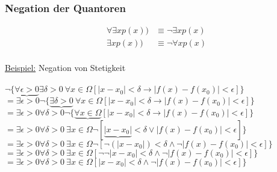 \subsubsection{Negation der Quantoren}
\begin{align*}
\forall\exists x  p(x)) & \equiv \neg\exists x p(x)\\
 \exists x  p(x)) & \equiv  \neg\forall x p(x)
\end{align*}\\
\underline{Beispiel:} Negation von Stetigkeit\\\qquad\\
$\neg\{\underbrace{\forall\epsilon>0}\exists\delta>0~\forall x\in \Omega [|x-x_{0}|<\delta\rightarrow|f(x)-f(x_{0})|<\epsilon]\}$\\
$=\exists\epsilon>0\neg\{\underbrace{\exists\delta>0}~\forall x\in \Omega [|x-x_{0}|<\delta\rightarrow|f(x)-f(x_{0})|<\epsilon]\}$\\
$=\exists\epsilon>0\forall\delta>0\neg\{\underbrace{\forall x\in \Omega} [|x-x_{0}|<\delta\rightarrow|f(x)-f(x_{0})|<\epsilon]\}$\\
$=\exists\epsilon>0\forall\delta>0~\exists x\in \Omega\neg [\underbrace{|x-x_{0}|}<\delta\vee|f(x)-f(x_{0})|<\epsilon]\}$\\
$=\exists\epsilon>0\forall\delta>0~\exists x\in \Omega\neg [\neg(|x-x_{0}|)<\delta\wedge\neg|f(x)-f(x_{0})|<\epsilon]\}$\\
$=\exists\epsilon>0\forall\delta>0~\exists x\in \Omega [\neg\neg|x-x_{0}|<\delta\wedge\neg|f(x)-f(x_{0})|<\epsilon]\}$\\
$=\exists\epsilon>0\forall\delta>0~\exists x\in \Omega [|x-x_{0}|<\delta\wedge\neg|f(x)-f(x_{0})|<\epsilon]\}$\\
